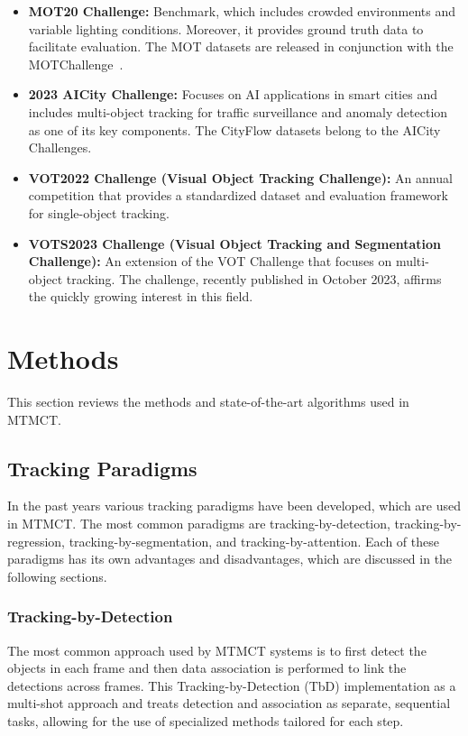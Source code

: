 \begin{itemize}
    \item \textbf{MOT20 Challenge:} Benchmark, which includes crowded environments and variable lighting conditions. Moreover, it provides ground truth data to facilitate evaluation. The MOT datasets are released in conjunction with the MOTChallenge~\cite{Dendorfer20}.
    \item \textbf{2023 AICity Challenge:} Focuses on AI applications in smart cities and includes multi-object tracking for traffic surveillance and anomaly detection as one of its key components. The CityFlow datasets belong to the AICity Challenges.~\cite{Naphade23}
    \item \textbf{VOT2022 Challenge (Visual Object Tracking Challenge):} An annual competition that provides a standardized dataset and evaluation framework for single-object tracking.~\cite{Kristan22}
    \item \textbf{VOTS2023 Challenge (Visual Object Tracking and Segmentation Challenge):} An extension of the VOT Challenge that focuses on multi-object tracking. The challenge, recently published in October 2023, affirms the quickly growing interest in this field.~\cite{Kristan23}
\end{itemize}

\section{Methods}\label{sec:methods}
This section reviews the methods and state-of-the-art algorithms used in MTMCT.

\subsection{Tracking Paradigms}\label{subsec:tracking_paradigms}
In the past years various tracking paradigms have been developed, which are used in MTMCT. The most common paradigms are tracking-by-detection, tracking-by-regression, tracking-by-segmentation, and tracking-by-attention. Each of these paradigms has its own advantages and disadvantages, which are discussed in the following sections.

\subsubsection{Tracking-by-Detection}\label{subsubsec:tracking-by-detection}
The most common approach used by MTMCT systems is to first detect the objects in each frame and then data association is performed to link the detections across frames. This Tracking-by-Detection (TbD) implementation as a multi-shot approach and treats detection and association as separate, sequential tasks, allowing for the use of specialized methods tailored for each step.


